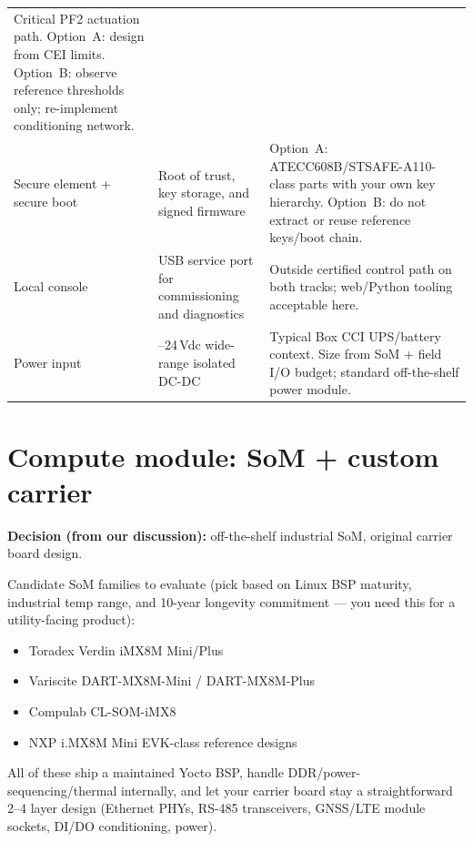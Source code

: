 \documentclass[11pt,a4paper]{article}
\begin{document}
\begin{table}[htbp]
\begin{tabularx}{\linewidth}{@{}>{\raggedright\arraybackslash}p{2.65cm}>{\raggedright\arraybackslash}p{5.4cm}>{\RaggedRight\arraybackslash}X@{}}
Critical PF2 actuation path. Option~A: design from CEI limits. Option~B: observe reference thresholds only; re-implement conditioning network. \\
Secure element + secure boot &
Root of trust, key storage, and signed firmware &
Option~A: ATECC608B/STSAFE-A110-class parts with your own key hierarchy. Option~B: do not extract or reuse reference keys/boot chain. \\
Local console &
USB service port for commissioning and diagnostics &
Outside certified control path on both tracks; web/Python tooling acceptable here. \\
Power input &
12--24\,Vdc wide-range isolated DC-DC &
Typical Box CCI UPS/battery context. Size from SoM + field I/O budget; standard off-the-shelf power module. \\
\bottomrule
\end{tabularx}
\end{table}

\section{Compute module: SoM + custom carrier}
\label{sec:som}

\textbf{Decision (from our discussion):} off-the-shelf industrial SoM, original carrier board design.

Candidate SoM families to evaluate (pick based on Linux BSP maturity, industrial temp range, and 10-year longevity
commitment --- you need this for a utility-facing product):

\begin{itemize}[noitemsep]
  \item Toradex Verdin iMX8M Mini/Plus
  \item Variscite DART-MX8M-Mini / DART-MX8M-Plus
  \item Compulab CL-SOM-iMX8
  \item NXP i.MX8M Mini EVK-class reference designs
\end{itemize}

All of these ship a maintained Yocto BSP, handle DDR/power-sequencing/thermal internally, and let your carrier board
stay a straightforward 2--4 layer design (Ethernet PHYs, RS-485 transceivers, GNSS/LTE module sockets, DI/DO conditioning, power).

\end{document}
